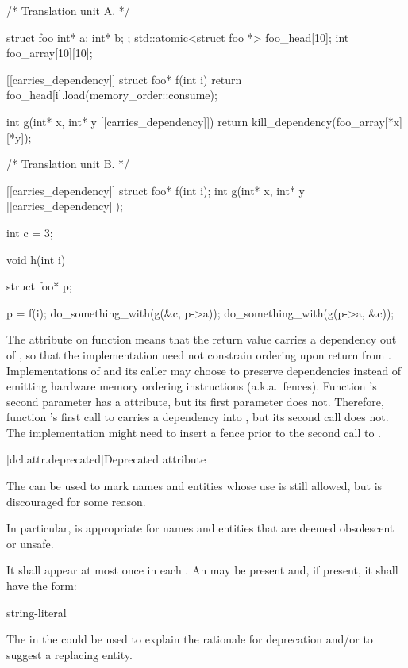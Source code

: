 \pnum
\begin{example}
\begin{codeblock}
/* Translation unit A. */

struct foo { int* a; int* b; };
std::atomic<struct foo *> foo_head[10];
int foo_array[10][10];

[[carries_dependency]] struct foo* f(int i) {
  return foo_head[i].load(memory_order::consume);
}

int g(int* x, int* y [[carries_dependency]]) {
  return kill_dependency(foo_array[*x][*y]);
}

/* Translation unit B. */

[[carries_dependency]] struct foo* f(int i);
int g(int* x, int* y [[carries_dependency]]);

int c = 3;

void h(int i) {
  struct foo* p;

  p = f(i);
  do_something_with(g(&c, p->a));
  do_something_with(g(p->a, &c));
}
\end{codeblock}

The  attribute on function  means that the
return value carries a dependency out of , so that the implementation
need not constrain ordering upon return from . Implementations of
 and its caller may choose to preserve dependencies instead of emitting
hardware memory ordering instructions (a.k.a.\ fences).
Function 's second parameter has a  attribute,
but its first parameter does not. Therefore, function 's first call to
 carries a dependency into , but its second call does not. The
implementation might need to insert a fence prior to the second call to
.
\end{example}
%

[dcl.attr.deprecated]{Deprecated attribute}%

\pnum
The   can be used to mark names and entities
whose use is still allowed, but is discouraged for some reason.
\begin{note}
In particular,
 is appropriate for names and entities that are deemed obsolescent or
unsafe.
\end{note}
It shall appear at most once in each . An
 may be present and, if present, it shall have the form:
\begin{ncbnf}
\terminal{(} string-literal \terminal{)}
\end{ncbnf}
\begin{note}
The  in the 
could be used to explain the rationale for deprecation and/or to suggest a replacing entity.
\end{note}

